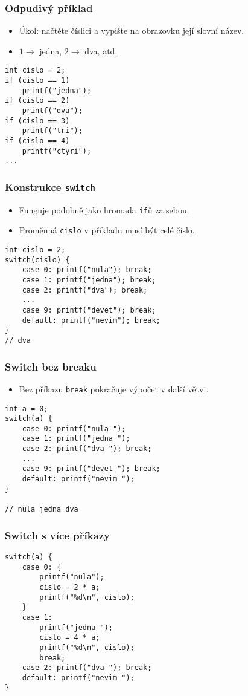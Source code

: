 \documentclass{beamer}
\newenvironment{itemizex}%
  {\large \begin{itemize}%
    \setlength{\itemsep}{8pt}%
    \setlength{\parskip}{8pt}}%
  {\end{itemize}}
\begin{document}
\begin{frame}[t,fragile]\frametitle{Odpudivý příklad} 
  \begin{itemizex}
    \item Úkol: načtěte číslici a vypište na obrazovku její slovní název.
    \item $1\longrightarrow$ jedna, $2\longrightarrow$ dva, atd.
  \end{itemizex}

  \begin{verbatim} 
int cislo = 2;
if (cislo == 1)
    printf("jedna");
if (cislo == 2)
    printf("dva");
if (cislo == 3)
    printf("tri");
if (cislo == 4)
    printf("ctyri");
...
  \end{verbatim}
\end{frame}


\begin{frame}[t,fragile]\frametitle{Konstrukce \texttt{switch}} 
  \begin{itemizex}
    \item Funguje podobně jako hromada \texttt{if}ů za sebou.
    \item Proměnná \texttt{cislo} v příkladu musí být celé číslo.
  \end{itemizex}
  \begin{verbatim} 
int cislo = 2;
switch(cislo) {
    case 0: printf("nula"); break;
    case 1: printf("jedna"); break;
    case 2: printf("dva"); break;
    ...
    case 9: printf("devet"); break;
    default: printf("nevim"); break;
}
// dva
  \end{verbatim}
\end{frame}



\begin{frame}[t,fragile]\frametitle{Switch bez breaku} 
\begin{itemizex}
  \item Bez příkazu \texttt{break} pokračuje výpočet v další větvi.
\end{itemizex}
\begin{verbatim} 
int a = 0;
switch(a) {
    case 0: printf("nula ");
    case 1: printf("jedna ");
    case 2: printf("dva "); break;
    ...
    case 9: printf("devet "); break;
    default: printf("nevim ");
}

// nula jedna dva 
\end{verbatim}
\end{frame}


\begin{frame}[t,fragile]\frametitle{Switch s více příkazy} 
  \begin{verbatim} 
switch(a) {
    case 0: {
        printf("nula");
        cislo = 2 * a;
        printf("%d\n", cislo);
    }
    case 1: 
        printf("jedna ");
        cislo = 4 * a;
        printf("%d\n", cislo);
        break;
    case 2: printf("dva "); break;
    default: printf("nevim ");
}
  \end{verbatim}
\end{frame}
\end{document}
